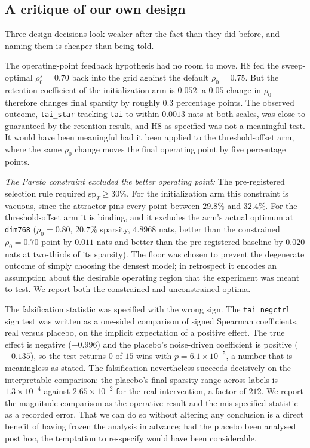 \documentclass[final,5p,times,twocolumn]{elsarticle}
\theoremstyle{remark}
\newcommand{\rhoz}{\rho_{0}}
\begin{document}
\subsection{A critique of our own design}
\label{sec:disc-designcritique}

Three design decisions look weaker after the fact than they did before, and
naming them is cheaper than being told.

The operating-point feedback hypothesis had no room to move. H8 fed the
sweep-optimal $\rhoz^\star = 0.70$ back into the grid against the default
$\rhoz = 0.75$. But the retention coefficient of the initialization arm is
$0.052$: a $0.05$ change in $\rhoz$ therefore changes final sparsity by roughly
$0.3$ percentage points. The observed outcome, \texttt{tai\_star} tracking
\texttt{tai} to within $0.0013$ nats at both scales, was close to guaranteed
by the retention result, and H8 as specified was not a meaningful test. It
would have been meaningful had it been applied to the threshold-offset arm,
where the same $\rhoz$ change moves the final operating point by five
percentage points.

\textit{The Pareto constraint excluded the better operating point:} The
pre-registered selection rule required $\mathrm{sp}_T \geq 30\%$. For the
initialization arm this constraint is vacuous, since the attractor pins every
point between $29.8\%$ and $32.4\%$. For the threshold-offset arm it is
binding, and it excludes the arm's actual optimum at \texttt{dim768}
($\rhoz = 0.80$, $20.7\%$ sparsity, $4.8968$ nats, better than the constrained
$\rhoz = 0.70$ point by $0.011$ nats and better than the pre-registered
baseline by $0.020$ nats at two-thirds of its sparsity). The floor was chosen to
prevent the degenerate outcome of simply choosing the densest model; in retrospect it
encodes an assumption about the desirable operating region that the experiment
was meant to test. We report both the constrained and unconstrained optima.

The falsification statistic was specified with the wrong sign. The
\texttt{tai\_negctrl} sign test was written as a one-sided comparison of signed
Spearman
coefficients, real versus placebo, on the implicit expectation of a positive
effect. The true effect is negative ($-0.996$) and the placebo's noise-driven
coefficient is positive ($+0.135$), so the test returns $0$ of $15$ wins
with $p = 6.1\times 10^{-5}$, a number that is meaningless as stated. The
falsification nevertheless succeeds decisively on the interpretable comparison:
the placebo's final-sparsity range across labels is $1.3\times 10^{-4}$ against
$2.65\times 10^{-2}$ for the real intervention, a factor of $212$. We report
the magnitude comparison as the operative result and the mis-specified
statistic as a recorded error. That we can do so without altering any
conclusion is a direct benefit of having frozen the analysis in advance; had
the placebo been analysed post hoc, the temptation to re-specify would have
been considerable.
\end{document}
